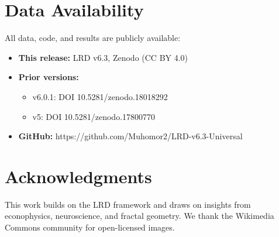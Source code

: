 \documentclass[11pt,a4paper]{article}
\begin{document}
\section{Data Availability}

All data, code, and results are publicly available:
\begin{itemize}
    \item \textbf{This release:} LRD v6.3, Zenodo (CC BY 4.0)
    \item \textbf{Prior versions:} 
    \begin{itemize}
        \item v6.0.1: DOI 10.5281/zenodo.18018292
        \item v5: DOI 10.5281/zenodo.17800770
    \end{itemize}
    \item \textbf{GitHub:} https://github.com/Muhomor2/LRD-v6.3-Universal
\end{itemize}

\section*{Acknowledgments}

This work builds on the LRD framework and draws on insights from econophysics, neuroscience, and fractal geometry. We thank the Wikimedia Commons community for open-licensed images.
\end{document}
